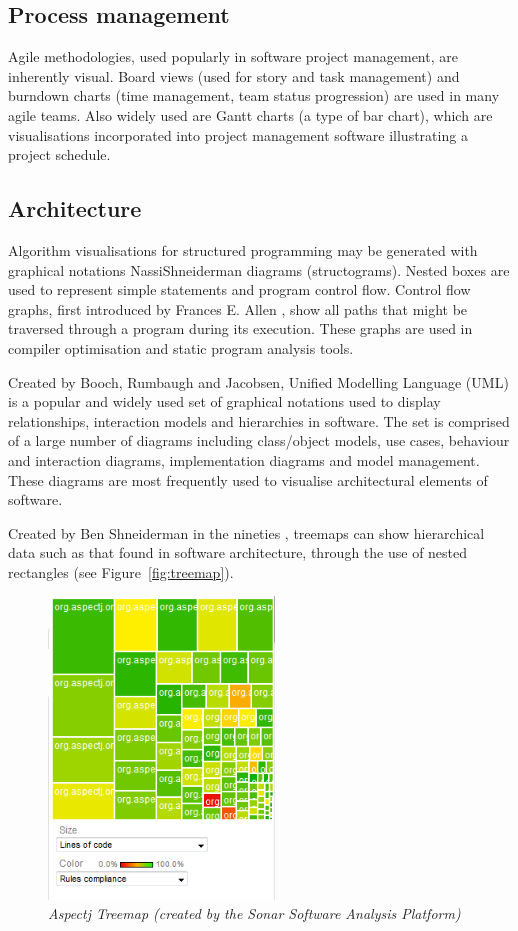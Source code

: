\subsection{Process management}

Agile methodologies, used popularly in software project management, are inherently visual. Board views (used for story and task management) and burndown charts (time management, team status progression) are used in many agile teams. Also widely used are Gantt charts (a type of bar chart), which are visualisations incorporated into project management software illustrating a project schedule. 

\subsection{Architecture}

Algorithm visualisations for structured programming may be generated with graphical notations Nassi\textemdash Shneiderman diagrams (structograms). Nested boxes are used to represent simple statements and program control flow. Control flow graphs, first introduced by Frances E. Allen \citep{allen70}, show all paths that might be traversed through a program during its execution. These graphs are used in compiler optimisation and static program analysis tools.

Created by Booch, Rumbaugh and Jacobsen, Unified Modelling Language (UML) \citep{umlomg} is a popular and widely used set of graphical notations used to display relationships, interaction models and hierarchies in software. The set is comprised of a large number of diagrams including class/object models, use cases, behaviour and interaction diagrams, implementation diagrams and model management. These diagrams are most frequently used to visualise architectural elements of software.

Created by Ben Shneiderman in the nineties \citep{shneiderman09}, treemaps can show hierarchical data such as that found in software architecture, through the use of nested rectangles (see Figure~\vref{fig:treemap}).

\begin{figure} [!htb]
  	 \centering
   	\includegraphics[width=60mm]{treemap.png}
  	\caption{\textit{Aspectj Treemap (created by the Sonar Software Analysis Platform)}}
	\label{fig:treemap}
\end{figure}

